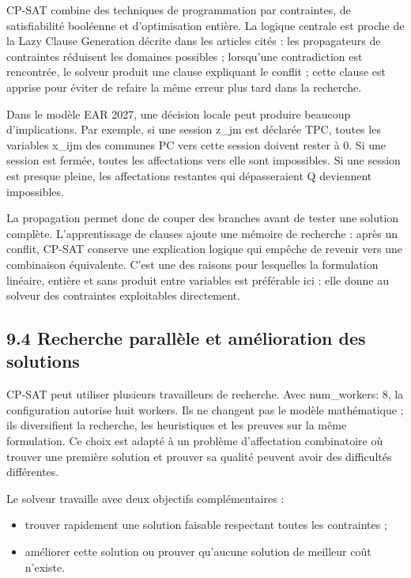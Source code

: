\documentclass[11pt,a4paper]{article}
\begin{document}
CP-SAT combine des techniques de programmation par contraintes, de satisfiabilité booléenne et d'optimisation entière. La logique centrale est proche de la Lazy Clause Generation décrite dans les articles cités : les propagateurs de contraintes réduisent les domaines possibles ; lorsqu'une contradiction est rencontrée, le solveur produit une clause expliquant le conflit ; cette clause est apprise pour éviter de refaire la même erreur plus tard dans la recherche.

Dans le modèle EAR 2027, une décision locale peut produire beaucoup d'implications. Par exemple, si une session z\_jm est déclarée TPC, toutes les variables x\_ijm des communes PC vers cette session doivent rester à 0. Si une session est fermée, toutes les affectations vers elle sont impossibles. Si une session est presque pleine, les affectations restantes qui dépasseraient Q deviennent impossibles.

La propagation permet donc de couper des branches avant de tester une solution complète. L'apprentissage de clauses ajoute une mémoire de recherche : après un conflit, CP-SAT conserve une explication logique qui empêche de revenir vers une combinaison équivalente. C'est une des raisons pour lesquelles la formulation linéaire, entière et sans produit entre variables est préférable ici : elle donne au solveur des contraintes exploitables directement.

\subsection{9.4 Recherche parallèle et amélioration des solutions}

CP-SAT peut utiliser plusieurs travailleurs de recherche. Avec num\_workers: 8, la configuration autorise huit workers. Ils ne changent pas le modèle mathématique ; ils diversifient la recherche, les heuristiques et les preuves sur la même formulation. Ce choix est adapté à un problème d'affectation combinatoire où trouver une première solution et prouver sa qualité peuvent avoir des difficultés différentes.

Le solveur travaille avec deux objectifs complémentaires :

\begin{itemize}
\item trouver rapidement une solution faisable respectant toutes les contraintes ;
\item améliorer cette solution ou prouver qu'aucune solution de meilleur coût
n'existe.

\end{itemize}
\end{document}
